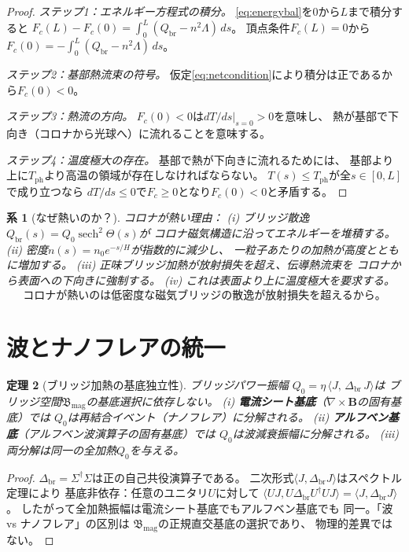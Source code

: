 \documentclass[12pt]{article}
\theoremstyle{plain}
\newtheorem{theorem}{定理}[section]
\newtheorem{corollary}[theorem]{系}
\theoremstyle{definition}
\numberwithin{equation}{section}
\newcommand{\br}{\mathrm{br}}
\newcommand{\ph}{\mathrm{ph}}
\newcommand{\fB}{\mathfrak{B}}
\DeclareMathOperator{\sech}{sech}
\begin{document}
\begin{proof}
\emph{ステップ1：エネルギー方程式の積分。}
\eqref{eq:energybal}を$0$から$L$まで積分すると
$F_c(L) - F_c(0) = \int_0^L(Q_{\br}-n^2\Lambda)\,ds$。
頂点条件$F_c(L)=0$から
$F_c(0) = -\int_0^L(Q_{\br}-n^2\Lambda)\,ds$。

\emph{ステップ2：基部熱流束の符号。}
仮定\eqref{eq:netcondition}により積分は正であるから$F_c(0)<0$。

\emph{ステップ3：熱流の方向。}
$F_c(0)<0$は$dT/ds|_{s=0}>0$を意味し、
熱が基部で下向き（コロナから光球へ）に流れることを意味する。

\emph{ステップ4：温度極大の存在。}
基部で熱が下向きに流れるためには、
基部より上に$T_{\ph}$より高温の領域が存在しなければならない。
$T(s)\leq T_{\ph}$が全$s\in[0,L]$で成り立つなら
$dT/ds\leq 0$で$F_c\geq 0$となり$F_c(0)<0$と矛盾する。
\end{proof}

\begin{corollary}[なぜ熱いのか？]
コロナが熱い理由：
(i) ブリッジ散逸$Q_{\br}(s)=Q_0\sech^2\Theta(s)$が
コロナ磁気構造に沿ってエネルギーを堆積する。
(ii) 密度$n(s)=n_0 e^{-s/H}$が指数的に減少し、
一粒子あたりの加熱が高度とともに増加する。
(iii) 正味ブリッジ加熱が放射損失を超え、伝導熱流束を
コロナから表面への下向きに強制する。
(iv) これは表面より上に温度極大を要求する。
\begin{equation}
\boxed{\text{コロナが熱いのは低密度な磁気ブリッジの散逸が放射損失を超えるから。}}
\end{equation}
\end{corollary}


\section{波とナノフレアの統一}\label{sec:unification}

\begin{theorem}[ブリッジ加熱の基底独立性]\label{thm:basis}
ブリッジパワー振幅
$Q_0 = \eta\,\langle J,\,\Delta_{\br}\,J\rangle$は
ブリッジ空間$\fB_{\mathrm{mag}}$の基底選択に依存しない。
(i) \textbf{電流シート基底}（$\nabla\times\mathbf{B}$の固有基底）では
$Q_0$は再結合イベント（ナノフレア）に分解される。
(ii) \textbf{アルフベン基底}（アルフベン波演算子の固有基底）では
$Q_0$は波減衰振幅に分解される。
(iii) 両分解は同一の全加熱$Q_0$を与える。
\end{theorem}

\begin{proof}
$\Delta_{\br}=\Sigma^\dagger\Sigma$は正の自己共役演算子である。
二次形式$\langle J,\Delta_{\br}J\rangle$はスペクトル定理により
基底非依存：任意のユニタリ$U$に対して
$\langle UJ, U\Delta_{\br}U^\dagger UJ\rangle
= \langle J, \Delta_{\br}J\rangle$。
したがって全加熱振幅は電流シート基底でもアルフベン基底でも
同一。「波 vs ナノフレア」の区別は
$\fB_{\mathrm{mag}}$の正規直交基底の選択であり、
物理的差異ではない。
\end{proof}
\end{document}
